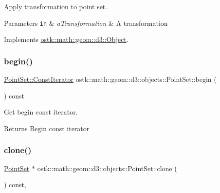 Apply transformation to point set. 


\begin{DoxyParams}[1]{Parameters}
\mbox{\tt in}  & {\em a\+Transformation} & A transformation \\
\hline
\end{DoxyParams}


Implements \hyperlink{classostk_1_1math_1_1geom_1_1d3_1_1_object_ae9194dd6d2bb4df09292ffc84dccdb1d}{ostk\+::math\+::geom\+::d3\+::\+Object}.

\mbox{\label{classostk_1_1math_1_1geom_1_1d3_1_1objects_1_1_point_set_ab660f9c1ab7ec392dce305a0d6cf72a5}} 
\subsubsection{\texorpdfstring{begin()}{begin()}}
{\footnotesize\ttfamily \hyperlink{classostk_1_1math_1_1geom_1_1d3_1_1objects_1_1_point_set_aa87eb9a571cb8b420e8c404005a2b723}{Point\+Set\+::\+Const\+Iterator} ostk\+::math\+::geom\+::d3\+::objects\+::\+Point\+Set\+::begin (\begin{DoxyParamCaption}{ }\end{DoxyParamCaption}) const}



Get begin const iterator. 

\begin{DoxyReturn}{Returns}
Begin const iterator 
\end{DoxyReturn}
\mbox{\label{classostk_1_1math_1_1geom_1_1d3_1_1objects_1_1_point_set_a5936e0dbba4443f938d074c5e77fdac7}} 
\subsubsection{\texorpdfstring{clone()}{clone()}}
{\footnotesize\ttfamily \hyperlink{classostk_1_1math_1_1geom_1_1d3_1_1objects_1_1_point_set}{Point\+Set} $\ast$ ostk\+::math\+::geom\+::d3\+::objects\+::\+Point\+Set\+::clone (\begin{DoxyParamCaption}{ }\end{DoxyParamCaption}) const\hspace{0.3cm}{\ttfamily [override]}, {\ttfamily [virtual]}}



